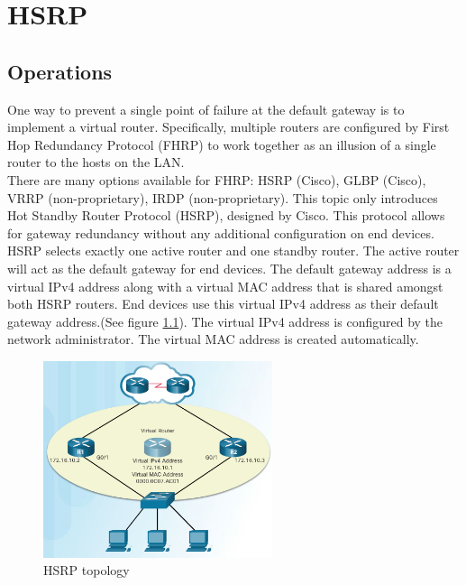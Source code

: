 \chapter{HSRP}

\section{Operations}

One way to prevent a single point of failure at the default gateway is to implement a virtual router. Specifically, multiple routers are configured by First Hop Redundancy Protocol (FHRP) to work together as an illusion of a single router to the hosts on the LAN. \\

There are many options available for FHRP: HSRP (Cisco), GLBP (Cisco), VRRP (non-proprietary), IRDP (non-proprietary). This topic only introduces Hot Standby Router Protocol (HSRP), designed by Cisco. This protocol allows for gateway redundancy without any additional configuration on end devices.\\
 
HSRP selects exactly one active router and one standby router. The active router will act as the default gateway for end devices. The default gateway address is a virtual IPv4 address along with a virtual MAC address that is shared amongst both HSRP routers. End devices use this virtual IPv4 address as their default gateway address.(See figure \ref{HSRP-topology}). The virtual IPv4 address is configured by the network administrator. The virtual MAC address is created automatically.

\begin{figure}[hbtp]
\centering
\includegraphics[width=0.6\textwidth]{pictures/HSRP.png}
\caption{HSRP topology}
\label{HSRP-topology}
\end{figure}

